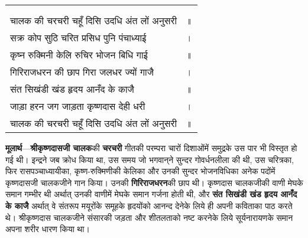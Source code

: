 
{
{\bfseries
\setlength{\mylenone}{0pt}
\settowidth{\mylentwo}{}
\setlength{\mylenone}{\maxof{\mylenone}{\mylentwo}}
\settowidth{\mylentwo}{चालक की चरचरी चहूँ दिसि उदधि अंत लों अनुसरी}
\setlength{\mylenone}{\maxof{\mylenone}{\mylentwo}}
\settowidth{\mylentwo}{सक्र कोप सुठि चरित प्रसिध पुनि पंचाध्याई}
\setlength{\mylenone}{\maxof{\mylenone}{\mylentwo}}
\settowidth{\mylentwo}{कृष्न रुक्मिनी केलि रुचिर भोजन बिधि गाई}
\setlength{\mylenone}{\maxof{\mylenone}{\mylentwo}}
\settowidth{\mylentwo}{गिरिराजधरन की छाप गिरा जलधर ज्यों गाजै}
\setlength{\mylenone}{\maxof{\mylenone}{\mylentwo}}
\settowidth{\mylentwo}{संत सिखंडी खंड हृदय आनँद के काजै}
\setlength{\mylenone}{\maxof{\mylenone}{\mylentwo}}
\settowidth{\mylentwo}{जाड़ा हरन जग जाड़ता कृष्णदास देही धरी}
\setlength{\mylenone}{\maxof{\mylenone}{\mylentwo}}
\settowidth{\mylentwo}{चालक की चरचरी चहूँ दिसि उदधि अंत लों अनुसरी}
\setlength{\mylenone}{\maxof{\mylenone}{\mylentwo}}
\setlength{\mylentwo}{\baselineskip}
\setlength{\mylenone}{\mylenone + 1pt}
\begin{longtable}[l]{@{\hspace*{\mylen}}>{\setlength\parfillskip{0pt}}p{\mylenone}@{}@{}l@{}}
 & \\[-\the\mylentwo]
\centering{॥ १२४ \hspace*{-1.5mm}॥} & \\ \nopagebreak
चालक की चरचरी चहूँ दिसि उदधि अंत लों अनुसरी & ॥\\
सक्र कोप सुठि चरित प्रसिध पुनि पंचाध्याई & ।\\ \nopagebreak
कृष्न रुक्मिनी केलि रुचिर भोजन बिधि गाई & ॥\\
गिरिराजधरन की छाप गिरा जलधर ज्यों गाजै & ।\\ \nopagebreak
संत सिखंडी खंड हृदय आनँद के काजै & ॥\\
जाड़ा हरन जग जाड़ता कृष्णदास देही धरी & ।\\ \nopagebreak
चालक की चरचरी चहूँ दिसि उदधि अंत लों अनुसरी & ॥
\end{longtable}
}
}
\begin{sloppypar}\justifying{}
\textbf{मूलार्थ}—\textbf{श्रीकृष्णदासजी चालक}की \textbf{चरचरी} गीतकी परम्परा चारों दिशाओंमें समुद्रके उस पार भी विस्तृत हो गई थी। इन्द्रने जब क्रोध किया था, उस समय जो भगवान्‌ने सुन्दर गोवर्धन\-लीला की थी, उस चरित्रका, फिर रास\-पञ्चाध्यायीका, कृष्ण-रुक्मिणीकी केलिका और उनकी सुन्दर भोजनविधिका अनेक पदोंमें कृष्णदासजी चालकजीने गान किया। उनकी \textbf{गिरिराज\-धरन}की छाप थी। कृष्णदास चालकजीकी वाणी मेघके समान गम्भीर थी अर्थात् उनकी वाणीमें मेघके समान गर्जना होती थी, और \textbf{संत सिखंडी खंड हृदय आनँद के काजै} अर्थात् वे संतरूप मयूरोंके समूहके हृदयोंको आनन्द देनेके लिये ही अपनी कविताका पाठ करते थे। श्रीकृष्णदास चालकजीने संसारकी जड़ता और शीतलताको नष्ट करनेके लिये सूर्यनारायणके समान अपना शरीर धारण किया था।
\end{sloppypar}

